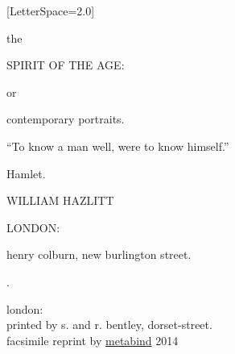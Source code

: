 \begingroup%
\thispagestyle{empty}

\setlength{\epigraphwidth}{0.7\textwidth}
\epigraphfontsize{\footnotesize}
\setlength{\epigraphrule}{0pt}

\fontspec{\millerdsc}[LetterSpace=2.0]

\centering

\begingroup %

{\Large the} \par
{}

{\HUGE \mdseries SPIRIT OF THE AGE:} \par
{}

{\large or} \par
{}

{\Huge \mdseries contemporary portraits.} \par
{}

\epigraph{
  ``To know a man well, were to know himself.''
}{\textmd{Hamlet.}} \par
{}

{\Large \mdseries WILLIAM HAZLITT} \par
{}

\begin{DoubleSpace}
{\large \mdseries LONDON:} \par
{\large \mdseries henry colburn, new burlington street.} \par
{\large {}.}
\end{DoubleSpace}

\endgroup %

\cleartoverso

\begingroup%
\thispagestyle{empty}
\vspace*{0.75\textheight}
\begin{DoubleSpace}
{\mdseries london:}\\
{\mdseries printed by s. and r. bentley, dorset-street.}\\
{\footnotesize \mdseries facsimile reprint by
  \href{http://metabind.com}{metabind} 2014}
\end{DoubleSpace}
\endgroup%

\endgroup%
\clearpage